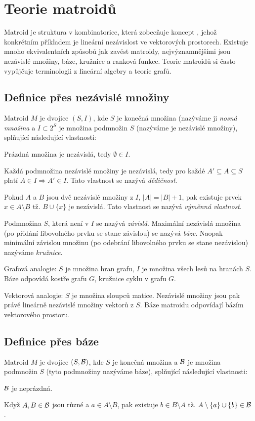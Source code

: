 \section{Teorie matroidů}

Matroid je struktura v kombinatorice, která zobecňuje koncept
, jehož konkrétním příkladem je lineární nezávislost ve
vektorových prostorech. Existuje mnoho ekvivalentních způsobů jak zavést
matroidy, nejvýznamnějšími jsou nezávislé množiny, báze, kružnice a ranková
funkce. Teorie matroidů si často vypůjčuje terminologii z lineární algebry a
teorie grafů.

\subsection{Definice přes nezávislé množiny}
\df Matroid $M$ je dvojice $(S,I)$, kde $S$ je konečná množina (nazýváme ji
\emph{nosná množina} a $I \subset 2^S$ je množina podmnožin $S$ (nazýváme je
nezávislé množiny), splňující následující vlastnosti:
\begin{enumerate*}
\item Prázdná množina je nezávislá, tedy $\emptyset \in I$.
\item Každá podmnožina nezávislé množiny je nezávislá, tedy pro každé $A' \subseteq A \subseteq S$ platí $A \in I \Rightarrow A' \in I$. Tato vlastnost se nazývá \emph{dědičnost}.
\item Pokud $A$ a $B$ jsou dvě nezávislé množiny z $I$, $|A| = |B| + 1$, pak existuje prvek $x\in A\setminus B$ tž. $B\cup\{x\}$ je nezávislá. Tato vlastnost se nazývá \emph{výměnná vlastnost}.
\end{enumerate*}

\df Podmnožina $S$, která není v $I$ se nazývá \emph{závislá}. Maximální nezávislá
množina (po přidání libovolného prvku se stane závislou) se nazývá \emph{báze}.
Naopak minimální závislou množinu (po odebrání libovolného prvku se stane
nezávislou) nazýváme \emph{kružnice}.

\pzn Grafová analogie: $S$ je množina hran grafu, $I$ je množina všech lesů na
hranách $S$. Báze odpovídá kostře grafu $G$, kružnice cyklu v grafu $G$.

\pzn Vektorová analogie: $S$ je množina sloupců matice. Nezávislé množiny jsou
pak právě lineárně nezávislé množiny vektorů z $S$. Báze matroidu odpovídají
bázím vektorového prostoru.

\subsection{Definice přes báze}
\df Matroid $M$ je dvojice $(S,\mathcal{B})$, kde $S$ je konečná množina a $\mathcal{B}$ je
množina podmnožin $S$ (tyto podmnožiny nazýváme báze), splňující následující
vlastnosti:
\begin{enumerate*}
\item $\mathcal{B}$ je neprázdná.
\item Když $A,B \in \mathcal{B}$ jsou různé a $a \in A\setminus B$, pak existuje $b \in B\setminus A$ tž. $A\setminus\{a\}\cup\{b\} \in \mathcal{B}$.
\end{enumerate*}

